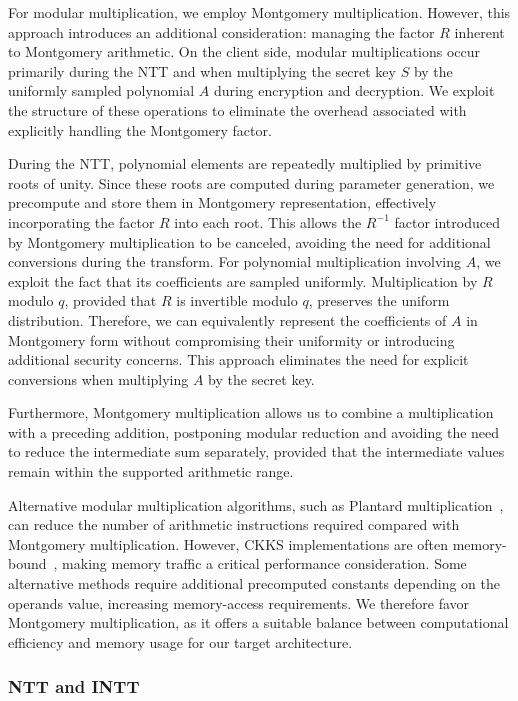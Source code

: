 For modular multiplication, we employ Montgomery multiplication. However, this approach introduces an additional consideration: managing the factor \(R\) inherent to Montgomery arithmetic. On the client side, modular multiplications occur primarily during the NTT and when multiplying the secret key \(S\) by the uniformly sampled polynomial \(A\) during encryption and decryption. We exploit the structure of these operations to eliminate the overhead associated with explicitly handling the Montgomery factor.

During the NTT, polynomial elements are repeatedly multiplied by primitive roots of unity. Since these roots are computed during parameter generation, we precompute and store them in Montgomery representation, effectively incorporating the factor \(R\) into each root. This allows the \(R^{-1}\) factor introduced by Montgomery multiplication to be canceled, avoiding the need for additional conversions during the transform. For polynomial multiplication involving \(A\), we exploit the fact that its coefficients are sampled uniformly. Multiplication by \(R\) modulo \(q\), provided that \(R\) is invertible modulo \(q\), preserves the uniform distribution. Therefore, we can equivalently represent the coefficients of \(A\) in Montgomery form without compromising their uniformity or introducing additional security concerns. This approach eliminates the need for explicit conversions when multiplying \(A\) by the secret key.

Furthermore, Montgomery multiplication allows us to combine a multiplication with a preceding addition, postponing modular reduction and avoiding the need to reduce the intermediate sum separately, provided that the intermediate values remain within the supported arithmetic range.

Alternative modular multiplication algorithms, such as Plantard multiplication~\cite{plantard2021efficient}, can reduce the number of arithmetic instructions required compared with Montgomery multiplication. However, CKKS implementations are often memory-bound~\cite{kim2022ark}, making memory traffic a critical performance consideration. Some alternative methods require additional precomputed constants depending on the operands value, increasing memory-access requirements. We therefore favor Montgomery multiplication, as it offers a suitable balance between computational efficiency and memory usage for our target architecture.

\subsubsection{NTT and INTT}
\label{work::arm::ntt}

